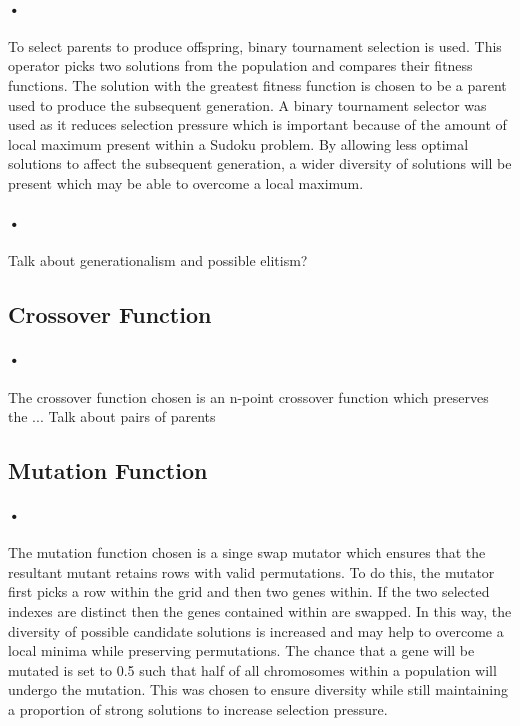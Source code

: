 \documentclass[10pt]{article}
\begin{document}
\paragraph{•}
To select parents to produce offspring, binary tournament selection is used. This operator picks two solutions from the population and compares their fitness functions. The solution with the greatest fitness function is chosen to be a parent used to produce the subsequent generation. A binary tournament selector was used as it reduces selection pressure which is important because of the amount of local maximum present within a Sudoku problem. By allowing less optimal solutions to affect the subsequent generation, a wider diversity of solutions will be present which may be able to overcome a local maximum.
\paragraph{•}
Talk about generationalism and possible elitism?
\subsection{Crossover Function}
\paragraph{•}
The crossover function chosen is an n-point crossover function which preserves the ... Talk about pairs of parents
\subsection{Mutation Function}
\paragraph{•}
The mutation function chosen is a singe swap mutator which ensures that the resultant mutant retains rows with valid permutations. To do this, the mutator first picks a row within the grid and then two genes within. If the two selected indexes are distinct then the genes contained within are swapped. In this way, the diversity of possible candidate solutions is increased and may help to overcome a local minima while preserving permutations. The chance that a gene will be mutated is set to 0.5 such that half of all chromosomes within a population will undergo the mutation. This was chosen to ensure diversity while still maintaining a proportion of strong solutions to increase selection pressure.
 
\end{document}
